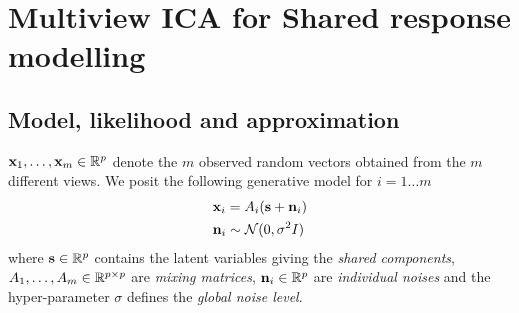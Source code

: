 \documentclass{report}
\begin{document}
{%

%
%
%
%
%
\section{Multiview ICA for Shared response modelling}
\label{sec:mvica}
\subsection{Model, likelihood and approximation}
$\mathbf{x}_1, \dots ,\mathbf{x}_m \in \mathbb{R}^p$ denote the $m$ observed random vectors obtained from the $m$ different views. We posit the following generative model for $i= 1\dots m$
\begin{align}
   &\mathbf{x}_i = A_i(\mathbf{s} + \mathbf{n}_i) \\
   & \mathbf{n}_i \sim\mathcal{N}(0, \sigma^2 I) \label{eq:mvica:model} 
\end{align}
where $\mathbf{s} \in \mathbb{R}^{p}$ contains the latent variables giving the \emph{shared components}, $A_1,\dots, A_m\in\mathbb{R}^{p\times p}$ are \emph{mixing matrices}, $\mathbf{n}_i \in
\mathbb{R}^{p}$ are \emph{individual noises} and the hyper-parameter $\sigma$ defines the
\emph{global noise level}.

}
\end{document}
